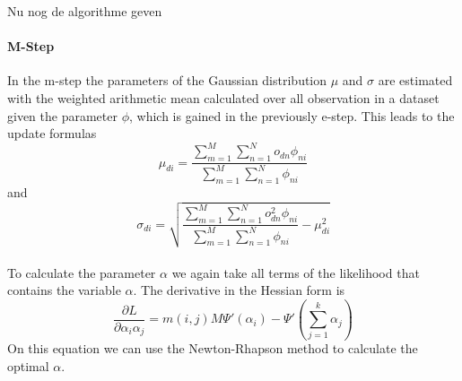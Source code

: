 \documentclass[11pt,a4paper]{article}
\begin{document}
  Nu nog de algorithme geven

  \paragraph{M-Step}
  
In the m-step the parameters of the Gaussian distribution $\mu$ and $\sigma$ are estimated with the weighted arithmetic mean calculated over all observation in a dataset given the parameter $\phi$, which is gained in the previously e-step. This leads to the update formulas
\begin{equation}
 \mu_{di} = \frac{\sum_{m=1}^M \sum_{n=1}^N o_{dn} \phi_{ni} }{\sum_{m=1}^M \sum_{n=1}^N  \phi_{ni}}
\end{equation}
and
\begin{equation}
 \sigma_{di} = \sqrt{\frac{\sum_{m=1}^M \sum_{n=1}^N o_{dn}^2 \phi_{ni} }{\sum_{m=1}^M \sum_{n=1}^N  \phi_{ni}} - \mu_{di}^2}
\end{equation}
\\
To calculate the parameter $\alpha$ we again take all terms of the likelihood that contains the variable $\alpha$. The derivative in the Hessian form is
\begin{equation}
 \frac{\partial L}{\partial \alpha_i\alpha_j} =  m(i,j) M \Psi'(\alpha_i) - \Psi'(\sum_{j=1}^k \alpha_j)
\end{equation}
On this equation we can use the Newton-Rhapson method to calculate the optimal $\alpha$.
\end{document}
